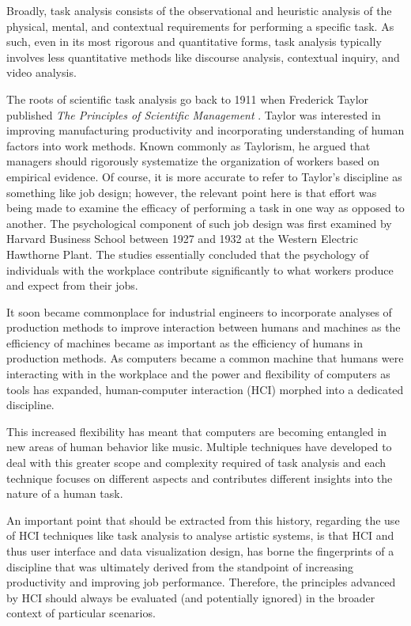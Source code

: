 Broadly, task analysis consists of the observational and heuristic analysis of the physical, mental, and contextual requirements for performing a specific task. As such, even in its most rigorous and quantitative forms, task analysis typically involves less quantitative methods like discourse analysis, contextual inquiry, and video analysis. 

The roots of scientific task analysis go back to 1911 when Frederick Taylor published \emph{The Principles of Scientific Management} \cite{crystal2004}. Taylor was interested in improving manufacturing productivity and incorporating understanding of human factors into work methods. Known commonly as Taylorism, he argued that managers should rigorously systematize the organization of workers based on empirical evidence. Of course, it is more accurate to refer to Taylor's discipline as something like job design; however, the relevant point here is that effort was being made to examine the efficacy of performing a task in one way as opposed to another. The psychological component of such job design was first examined by Harvard Business School between 1927 and 1932 at the Western Electric Hawthorne Plant. The studies essentially concluded that the psychology of individuals with the workplace contribute significantly to what workers produce and expect from their jobs.

It soon became commonplace for industrial engineers to incorporate analyses of production methods to improve interaction between humans and machines as the efficiency of machines became as important as the efficiency of humans in production methods. As computers became a common machine that humans were interacting with in the workplace and the power and flexibility of computers as tools has expanded, human-computer interaction (HCI) morphed into a dedicated discipline. 

This increased flexibility has meant that computers are becoming entangled in new areas of human behavior like music. Multiple techniques have developed to deal with this greater scope and complexity required of task analysis and each technique focuses on different aspects and contributes different insights into the nature of a human task.

An important point that should be extracted from this history, regarding the use of HCI techniques like task analysis to analyse artistic systems, is that HCI and thus user interface and data visualization design, has borne the fingerprints of a discipline that was ultimately derived from the standpoint of increasing productivity and improving job performance. Therefore, the principles advanced by HCI should always be evaluated (and potentially ignored) in the broader context of particular scenarios. 

